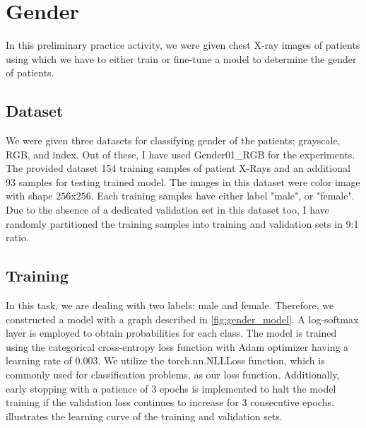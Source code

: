 \section{Gender}
\label{sec:warmup3}

    In this preliminary practice activity, we were given chest X-ray images of patients using which we have to either train or fine-tune a model to determine the gender of patients.

\subsection{Dataset}
    We were given three datasets for classifying gender of the patients; grayscale, RGB, and index. Out of these, I have used Gender01\_RGB for the experiments. The provided dataset 154 training samples of patient X-Rays and an additional 93 samples for testing trained model.  The images in this dataset were color image with shape $256$x$256$. Each training samples have either label "male", or "female". Due to the absence of a dedicated validation set in this dataset too, I have randomly partitioned the training samples into training and validation sets in 9:1 ratio.

\subsection{Training}

    In this task, we are dealing with two labels: male and female. Therefore, we constructed a model with a graph described in \cref{fig:gender_model}. A log-softmax layer is employed to obtain probabilities for each class. The model is trained using the categorical cross-entropy loss function with Adam optimizer having a learning rate of $0.003$. We utilize the torch.nn.NLLLoss function, which is commonly used for classification problems, as our loss function. Additionally, early stopping with a patience of 3 epochs is implemented to halt the model training if the validation loss continues to increase for 3 consecutive epochs.  illustrates the learning curve of the training and validation sets.

